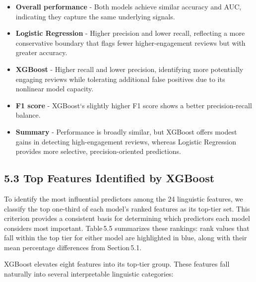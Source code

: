 \documentclass[
]{article}
\begin{document}
\begin{itemize}

\item \textbf{Overall performance} - Both models achieve similar accuracy and AUC, indicating they capture the same underlying signals. 

\item \textbf{Logistic Regression} - Higher precision and lower recall, reflecting a more conservative boundary that flags fewer higher-engagement reviews but with greater accuracy.

\item \textbf{XGBoost} - Higher recall and lower precision, identifying more potentially engaging reviews while tolerating additional false positives due to its nonlinear model capacity.  

\item \textbf{F1 score} - XGBoost`s slightly higher F1 score shows a better precision-recall balance.

\item \textbf{Summary} - Performance is broadly similar, but XGBoost offers modest gains in detecting high-engagement reviews, whereas Logistic Regression provides more selective, precision-oriented predictions.  

\end{itemize}

\hypertarget{top-features-identified-by-xgboost}{%
\subsection{5.3 Top Features Identified by
XGBoost}\label{top-features-identified-by-xgboost}}

To identify the most influential predictors among the 24 linguistic
features, we classify the top one‑third of each model's ranked features
as its top‑tier set. This criterion provides a consistent basis for
determining which predictors each model considers most important.
Table\,5.5 summarizes these rankings: rank values that fall within the
top tier for either model are highlighted in blue, along with their mean
percentage differences from Section\,5.1.

XGBoost elevates eight features into its top‑tier group. These features
fall naturally into several interpretable linguistic categories:
\end{document}
